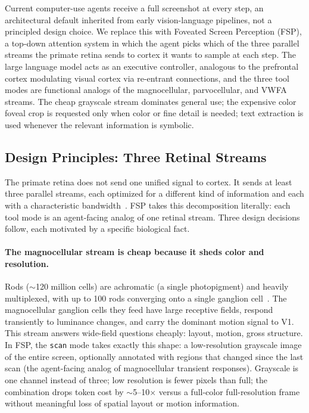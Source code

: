 \documentclass[11pt,a4paper]{article}
\begin{document}
Current computer-use agents receive a full screenshot at every step, an
architectural default inherited from early vision-language pipelines, not a
principled design choice. We replace this with Foveated Screen
Perception (FSP), a top-down attention system in which the agent picks which
of the three parallel streams the primate retina sends to cortex it
wants to sample at each step. The large language model acts as an executive
controller, analogous to the prefrontal cortex modulating visual cortex via
re-entrant connections, and the three tool modes are functional analogs of the
magnocellular, parvocellular, and VWFA streams. The cheap grayscale stream
dominates general use; the expensive color foveal crop is requested only when
color or fine detail is needed; text extraction is used whenever the relevant
information is symbolic.

\subsection{Design Principles: Three Retinal Streams}
\label{sec:design-principles}

The primate retina does not send one unified signal to cortex. It sends at least
three parallel streams, each optimized for a different kind of information and
each with a characteristic bandwidth~\cite{livingstone-hubel-segregation}. FSP
takes this decomposition literally: each tool mode is an agent-facing analog of
one retinal stream. Three design decisions follow, each motivated by a specific
biological fact.

\paragraph{The magnocellular stream is cheap because it sheds color and
resolution.}
Rods ($\sim$120 million cells) are achromatic (a single photopigment) and
heavily multiplexed, with up to 100 rods converging onto a single ganglion
cell~\cite{curcio-photoreceptor}. The magnocellular ganglion cells they feed
have large receptive fields, respond transiently to luminance changes, and
carry the dominant motion signal to V1. This stream answers wide-field
questions cheaply: layout, motion, gross structure. In FSP, the \texttt{scan}
mode takes exactly this shape: a low-resolution grayscale image of the entire
screen, optionally annotated with regions that changed since the last scan
(the agent-facing analog of magnocellular transient responses). Grayscale is
one channel instead of three; low resolution is fewer pixels than full; the
combination drops token cost by $\sim$5--10$\times$ versus a full-color
full-resolution frame without meaningful loss of spatial layout or motion
information.
\end{document}
